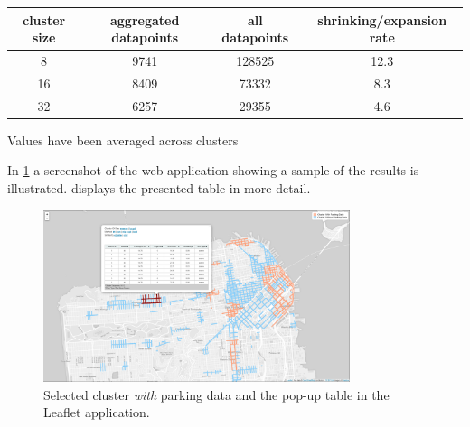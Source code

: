 \documentclass{ws-ijait}
\begin{document}
	\begin{table}[!ht]
		{\begin{tabular}{ | c | c | c | c | } %
				\hline
				{cluster size} & {aggregated datapoints} & {all datapoints} & {shrinking/expansion rate} \\ \hline
				8 &	9741 & 128525 &	12.3 \\ \hline
				16 & 8409 &	73332 &	8.3 \\ \hline
				32 & 6257 &	29355 &	4.6 \\ \hline
		\end{tabular}}
		\begin{tabnote}
			Values have been averaged across clusters
		\end{tabnote}
		\label{tab:models_training_points}
	\end{table}
		
	In \cref{fig:cwith} a screenshot of the web application showing a sample of the results is illustrated.  displays the presented table in more detail.
	
	\begin{figure}[!ht]
		\centering
		\includegraphics[width=0.8\textwidth]{../graphics/cwith_source_dt_cosine.png}
		\caption{Selected cluster \textit{with} parking data and the pop-up table in the Leaflet application.}
		\label{fig:cwith}
	\end{figure}
	
\end{document}
